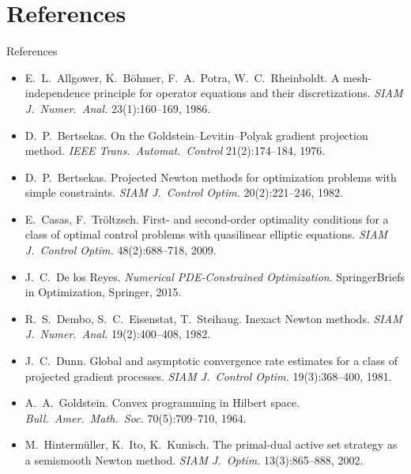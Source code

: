 \documentclass[main.tex]{subfiles}
\begin{document}
\section*{References}
\begin{frame}[allowframebreaks]{References}
  \scriptsize
  \begin{itemize}
    \item E.~L.~Allgower, K.~B\"ohmer, F.~A.~Potra, W.~C.~Rheinboldt. A mesh-independence principle for operator equations and their discretizations. \emph{SIAM J.\ Numer.\ Anal.} 23(1):160--169, 1986. 
    \item D.~P.~Bertsekas. On the Goldstein--Levitin--Polyak gradient projection method. \emph{IEEE Trans.\ Automat.\ Control} 21(2):174--184, 1976. 
    \item D.~P.~Bertsekas. Projected Newton methods for optimization problems with simple constraints. \emph{SIAM J.\ Control Optim.} 20(2):221--246, 1982. 
    \item E.~Casas, F.~Tr\"oltzsch. First- and second-order optimality conditions for a class of optimal control problems with quasilinear elliptic equations. \emph{SIAM J.\ Control Optim.} 48(2):688--718, 2009. 
    \item J.~C.~De los Reyes. \emph{Numerical PDE-Constrained Optimization}. SpringerBriefs in Optimization, Springer, 2015. 
    \item R.~S.~Dembo, S.~C.~Eisenstat, T.~Steihaug. Inexact Newton methods. \emph{SIAM J.\ Numer.\ Anal.} 19(2):400--408, 1982. 
    \item J.~C.~Dunn. Global and asymptotic convergence rate estimates for a class of projected gradient processes. \emph{SIAM J.\ Control Optim.} 19(3):368--400, 1981. 
    \item A.~A.~Goldstein. Convex programming in Hilbert space. \emph{Bull.\ Amer.\ Math.\ Soc.} 70(5):709--710, 1964. 
    \item M.~Hinterm\"uller, K.~Ito, K.~Kunisch. The primal-dual active set strategy as a semismooth Newton method. \emph{SIAM J.\ Optim.} 13(3):865--888, 2002. 

\end{itemize}
\end{frame}
\end{document}
